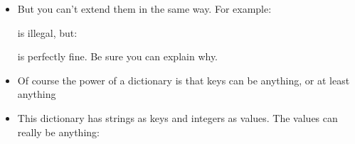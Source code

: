 \documentclass[letterpaper,10pt,english]{sphinxmanual}
\begin{document}
\begin{itemize}
\item {} 
But you can’t extend them in the same way.  For example:

%
\begin{sphinxVerbatim}[commandchars=\\\{\}]
\PYG{p}{[}\PYG{p}{]}  
\end{sphinxVerbatim}

is illegal, but:

%
\begin{sphinxVerbatim}[commandchars=\\\{\}]
\PYG{p}{[}\PYG{p}{]}  
\end{sphinxVerbatim}

is perfectly fine.  Be sure you can explain why.

\item {} 
Of course the power of a dictionary is that keys can be anything, or at least anything

%
\begin{sphinxVerbatim}[commandchars=\\\{\}]
   
\PYG{p}{[}\PYG{p}{]}
\end{sphinxVerbatim}

\item {} 
This dictionary has strings as keys and integers as values.
The values can really be anything:

%
\begin{sphinxVerbatim}[commandchars=\\\{\}]
    \PYG{p}{[}\PYG{p}{]}    \PYG{p}{[}\PYG{p}{]}  
\PYG{p}{[}\PYG{p}{]}
\end{sphinxVerbatim}


\end{itemize}
\end{document}
